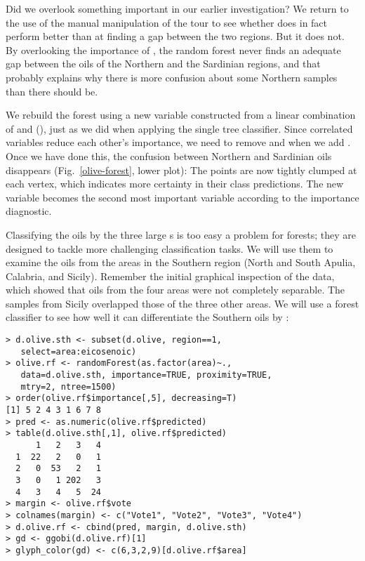 Did we overlook something important in our earlier investigation?  We
return to the use of the manual manipulation of the tour
 to see whether  does in fact perform
better than  at finding a gap between the two regions.
But it does not.  By overlooking the importance of ,
the random forest never finds an adequate gap between the oils of the
Northern and the Sardinian regions, and that probably explains why there
is more confusion about some Northern samples than there should be.

We rebuild the forest using a new variable constructed from a linear
combination of  and  (),
just as we did when applying the single tree classifier.  Since
correlated variables reduce each other's importance, we need to remove
 and  when we add .  Once we
have done this, the confusion between Northern and Sardinian oils
disappears (Fig.~\ref{olive-forest}, lower plot): The points are now
tightly clumped at each vertex, which indicates more certainty in
their class predictions. The new variable becomes the second most
important variable according to the importance diagnostic.


Classifying the oils by the three large s is too easy a
problem for forests; they are designed to tackle more challenging
classification tasks. We will use them to examine the oils from the
areas in the Southern region (North and South Apulia, Calabria, and
Sicily). Remember the initial graphical inspection of the data, which
showed that oils from the four areas were not completely
separable. The samples from Sicily overlapped those of the three other
areas.  We will use a forest classifier to see how well it can
differentiate the Southern oils by :

\newpage %
\begin{verbatim}
> d.olive.sth <- subset(d.olive, region==1, 
   select=area:eicosenoic)
> olive.rf <- randomForest(as.factor(area)~., 
   data=d.olive.sth, importance=TRUE, proximity=TRUE, 
   mtry=2, ntree=1500)
> order(olive.rf$importance[,5], decreasing=T)
[1] 5 2 4 3 1 6 7 8
> pred <- as.numeric(olive.rf$predicted)
> table(d.olive.sth[,1], olive.rf$predicted)
      1   2   3   4
  1  22   2   0   1
  2   0  53   2   1
  3   0   1 202   3
  4   3   4   5  24
> margin <- olive.rf$vote
> colnames(margin) <- c("Vote1", "Vote2", "Vote3", "Vote4")
> d.olive.rf <- cbind(pred, margin, d.olive.sth)
> gd <- ggobi(d.olive.rf)[1]
> glyph_color(gd) <- c(6,3,2,9)[d.olive.rf$area]
\end{verbatim} 

